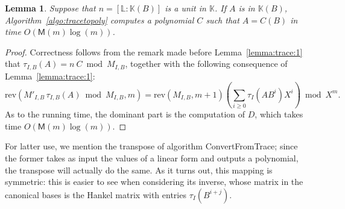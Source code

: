 \documentclass[12pt]{article}
\def\M {\ensuremath{\mathsf{M}}}
\def\K {\ensuremath{\mathbb{K}}}
\def\L {\ensuremath{\mathbb{L}}}
\def\mulmod {\ensuremath{\mathrm{mulmod}}}
\def\rev {\ensuremath{\mathrm{rev}}}
\newtheorem{Lemma}{Lemma}
\begin{document}
\begin{Lemma}
  Suppose that $n=[\L:\K(B)]$ is a unit in $\K$. If $A$ is in
  $\K(B)$, Algorithm~\ref{algo:tracetopoly} computes a polynomial $C$
  such that $A=C(B)$ in time $O(\M(m)\log(m))$.
\end{Lemma}
\begin{proof}
  Correctness follows from the remark made before
  Lemma~\ref{lemma:trace:1} that $\tau_{I,B}(A)=n \ C \bmod M_{I,B}$,
  together with the following consequence of Lemma~\ref{lemma:trace:1}:
$$ \rev( M'_{I,B}\, \tau_{I,B}  (A) \bmod M_{I,B},m) = \rev(M_{I,B},m+1) \left (\sum_{i \ge 0} \tau_I(A B^i) X^i \right )  \bmod X^m.$$
  As to the running time, the dominant part is the computation of $D$,
  which takes time $O(\M(m)\log(m))$.
\end{proof}

For latter use, we mention the transpose of algorithm
ConvertFromTrace; since the former takes as input the values of a
linear form and outputs a polynomial, the transpose will actually do
the same. As it turns out, this mapping is symmetric: this is easier
to see when considering its inverse, whose matrix in the canonical
bases is the Hankel matrix with entries $\tau_I(B^{i+j})$.


\end{document}
